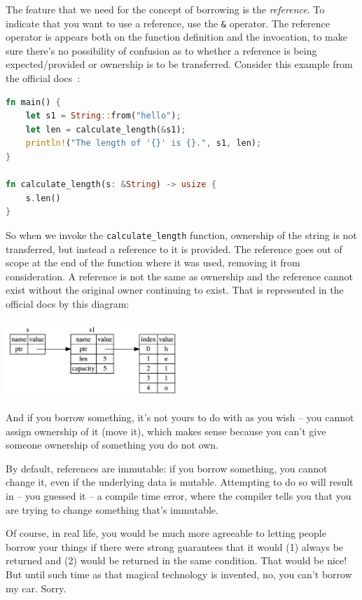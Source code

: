 \documentclass[a4paper]{report}
\begin{document}
The feature that we need for the concept of borrowing is the \textit{reference}. To indicate that you want to use a reference, use the \texttt{\&} operator. The reference operator is appears both on the function definition and the invocation, to make sure there's no possibility of confusion as to whether a reference is being expected/provided or ownership is to be transferred.  Consider this example from the official docs~\cite{rustdocs}:

\begin{lstlisting}[language=Rust]
fn main() {
    let s1 = String::from("hello");
    let len = calculate_length(&s1);
    println!("The length of '{}' is {}.", s1, len);
}

fn calculate_length(s: &String) -> usize {
    s.len()
}
\end{lstlisting}

So when we invoke the \texttt{calculate\_length} function, ownership of the string is not transferred, but instead a reference to it is provided. The reference goes out of scope at the end of the function where it was used, removing it from consideration. A reference is not the same as ownership and the reference cannot exist without the original owner continuing to exist. That is represented in the official docs by this diagram:

\begin{center}
\includegraphics[width=0.5\textwidth]{images/string-with-ref.png}
\end{center}

And if you borrow something, it's not yours to do with as you wish -- you cannot assign ownership of it (move it), which makes sense because you can't give someone ownership of something you do not own.

By default, references are immutable: if you borrow something, you cannot change it, even if the underlying data is mutable. Attempting to do so will result in -- you guessed it -- a compile time error, where the compiler tells you that you are trying to change something that's immutable. 

Of course, in real life, you would be much more agreeable to letting people borrow your things if there were strong guarantees that it would (1) always be returned and (2) would be returned in the same condition. That would be nice! But until such time as that magical technology is invented, no, you can't borrow my car. Sorry.
\end{document}

